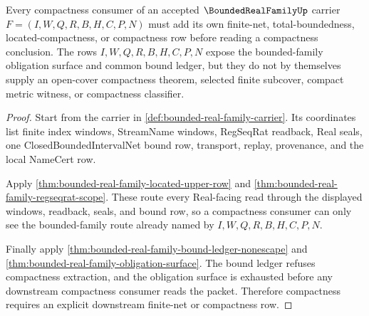 \begin{theorem}
\label{thm:bounded-real-family-compactness-consumer-boundary}
Every compactness consumer of an accepted $\BoundedRealFamilyUp$ carrier $F=(I,W,Q,R,B,H,C,P,N)$ must add its own finite-net, total-boundedness, located-compactness, or compactness row before reading a compactness conclusion. The rows $I,W,Q,R,B,H,C,P,N$ expose the bounded-family obligation surface and common bound ledger, but they do not by themselves supply an open-cover compactness theorem, selected finite subcover, compact metric witness, or compactness classifier.
\end{theorem}
\begin{proof}
Start from the carrier in \autoref{def:bounded-real-family-carrier}. Its coordinates list finite index windows, StreamName windows, RegSeqRat readback, Real seals, one ClosedBoundedIntervalNet bound row, transport, replay, provenance, and the local NameCert row.

Apply \autoref{thm:bounded-real-family-located-upper-row} and \autoref{thm:bounded-real-family-regseqrat-scope}. These route every Real-facing read through the displayed windows, readback, seals, and bound row, so a compactness consumer can only see the bounded-family route already named by $I,W,Q,R,B,H,C,P,N$.

Finally apply \autoref{thm:bounded-real-family-bound-ledger-nonescape} and \autoref{thm:bounded-real-family-obligation-surface}. The bound ledger refuses compactness extraction, and the obligation surface is exhausted before any downstream compactness consumer reads the packet. Therefore compactness requires an explicit downstream finite-net or compactness row.
\end{proof}

